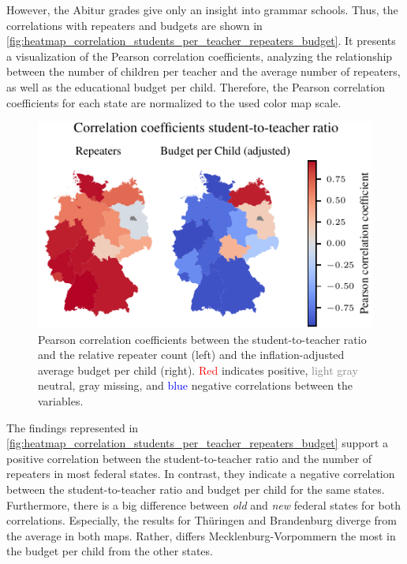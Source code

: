 However, the Abitur grades give only an insight into grammar schools. Thus, the correlations with repeaters and budgets are shown in \autoref{fig:heatmap_correlation_students_per_teacher_repeaters_budget}. It presents a visualization of the Pearson correlation coefficients, analyzing the relationship between the number of children per teacher and the average number of repeaters, as well as the educational budget per child. Therefore, the Pearson correlation coefficients for each state are normalized to the used color map scale.

\begin{figure}[ht]
    \centering
    \includegraphics{fig/fig_heatmap_correlation_students_per_teacher_repeaters_budget.pdf}
    \caption{Pearson correlation coefficients between the student-to-teacher ratio and the relative repeater count (left) and the inflation-adjusted average budget per child (right). \textcolor{red}{Red} indicates positive, \textcolor{gray}{light gray} neutral, \textcolor{TUdark}{gray} missing, and \textcolor{blue}{blue} negative correlations between the variables.}
    \label{fig:heatmap_correlation_students_per_teacher_repeaters_budget}
\end{figure}

The findings represented in \autoref{fig:heatmap_correlation_students_per_teacher_repeaters_budget} support a  positive correlation between the student-to-teacher ratio and the number of repeaters in most federal states. In contrast, they indicate a negative correlation between the student-to-teacher ratio  and budget per child for the same states. Furthermore, there is a big difference between \emph{old} and \emph{new} federal states for both correlations. Especially, the results for Thüringen and Brandenburg diverge from the average in both maps. Rather, differs Mecklenburg-Vorpommern the most in the budget per child from the other states.

